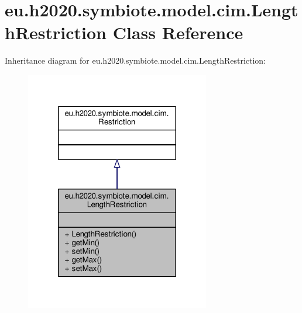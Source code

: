 \hypertarget{classeu_1_1h2020_1_1symbiote_1_1model_1_1cim_1_1LengthRestriction}{}\section{eu.\+h2020.\+symbiote.\+model.\+cim.\+Length\+Restriction Class Reference}
\label{classeu_1_1h2020_1_1symbiote_1_1model_1_1cim_1_1LengthRestriction}


Inheritance diagram for eu.\+h2020.\+symbiote.\+model.\+cim.\+Length\+Restriction\+:
\nopagebreak
\begin{figure}[H]
\begin{center}
\leavevmode
\includegraphics[width=228pt]{classeu_1_1h2020_1_1symbiote_1_1model_1_1cim_1_1LengthRestriction__inherit__graph}
\end{center}
\end{figure}



